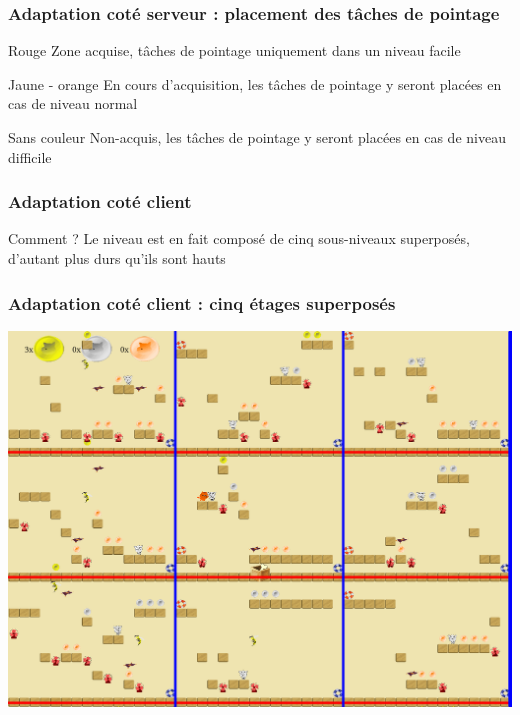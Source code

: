 \documentclass{beamer}
\begin{document}
\begin{frame}
\frametitle{Adaptation coté serveur : placement des tâches de pointage}

\begin{block}{Rouge}
Zone acquise, tâches de pointage uniquement dans un niveau facile
\end{block}

\begin{block}{Jaune - orange}
En cours d'acquisition, les tâches de pointage y seront placées en cas de niveau normal
\end{block}

\begin{block}{Sans couleur}
Non-acquis, les tâches de pointage y seront placées en cas de niveau difficile
\end{block}

\end{frame}

\begin{frame}
\frametitle{Adaptation coté client}
\begin{block}{Comment ?}
Le niveau est en fait composé de cinq sous-niveaux superposés, d'autant plus durs qu'ils sont hauts
\end{block}

\end{frame}

\begin{frame}
\frametitle{Adaptation coté client : cinq étages superposés}

\centering \includegraphics[scale=0.18]{images/3etages.png}

\end{frame}
\end{document}
